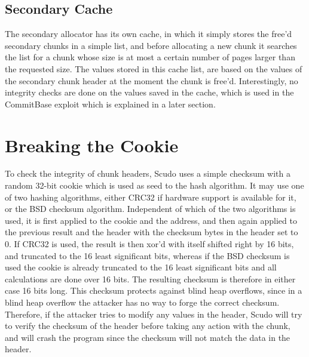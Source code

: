 \documentclass[a4paper,11pt,oneside]{report}
\begin{document}
\section{Secondary Cache}

The secondary allocator has its own cache, in which it simply stores the free'd secondary
chunks in a simple list, and before allocating a new chunk it searches the list for a
chunk whose size is at most a certain number of pages larger than the requested size. The
values stored in this cache list, are based on the values of the secondary chunk header at
the moment the chunk is free'd. Interestingly, no integrity checks are done on the values
saved in the cache, which is used in the CommitBase exploit which is explained in a later
section.


\chapter{Breaking the Cookie}

To check the integrity of chunk headers, Scudo uses a simple checksum with a random 32-bit
cookie which is used as seed to the hash algorithm. It may use one of two hashing
algorithms, either CRC32 if hardware support is available for it, or the BSD checksum
algorithm. Independent of which of the two algorithms is used, it is first applied to the
cookie and the address, and then again applied to the previous result and the header with
the checksum bytes in the header set to 0. If CRC32 is used, the result is then xor'd with
itself shifted right by 16 bits, and truncated to the 16 least significant bits, whereas
if the BSD checksum is used the cookie is already truncated to the 16 least significant
bits and all calculations are done over 16 bits. The resulting checksum is therefore in
either case 16 bits long.
This checksum protects against blind heap overflows, since in a blind heap overflow the
attacker has no way to forge the correct checksum. Therefore, if the attacker tries to
modify any values in the header, Scudo will try to verify the checksum of the header
before taking any action with the chunk, and will crash the program since the checksum
will not match the data in the header.
\end{document}
